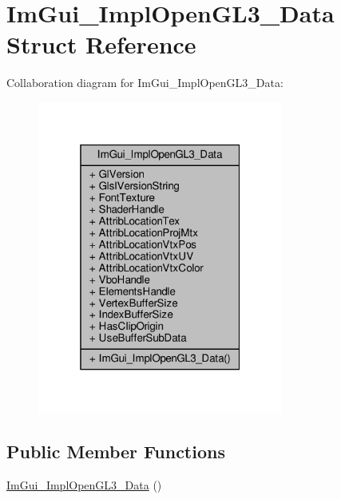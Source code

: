 \hypertarget{structImGui__ImplOpenGL3__Data}{}\section{Im\+Gui\+\_\+\+Impl\+Open\+G\+L3\+\_\+\+Data Struct Reference}
\label{structImGui__ImplOpenGL3__Data}


Collaboration diagram for Im\+Gui\+\_\+\+Impl\+Open\+G\+L3\+\_\+\+Data\+:
\nopagebreak
\begin{figure}[H]
\begin{center}
\leavevmode
\includegraphics[width=229pt]{structImGui__ImplOpenGL3__Data__coll__graph}
\end{center}
\end{figure}
\subsection*{Public Member Functions}
\begin{DoxyCompactItemize}
\item 
\hyperlink{structImGui__ImplOpenGL3__Data_a6bc713060002e1ac64f1daa7b7cecb59}{Im\+Gui\+\_\+\+Impl\+Open\+G\+L3\+\_\+\+Data} ()
\end{DoxyCompactItemize}
